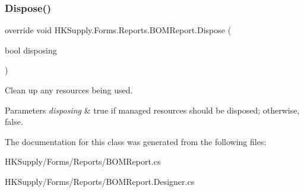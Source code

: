 \subsubsection{\texorpdfstring{Dispose()}{Dispose()}}
{\footnotesize\ttfamily override void H\+K\+Supply.\+Forms.\+Reports.\+B\+O\+M\+Report.\+Dispose (\begin{DoxyParamCaption}\item[{bool}]{disposing }\end{DoxyParamCaption})\hspace{0.3cm}{\ttfamily [protected]}}



Clean up any resources being used. 


\begin{DoxyParams}{Parameters}
{\em disposing} & true if managed resources should be disposed; otherwise, false.\\
\hline
\end{DoxyParams}


The documentation for this class was generated from the following files\+:\begin{DoxyCompactItemize}
\item 
H\+K\+Supply/\+Forms/\+Reports/B\+O\+M\+Report.\+cs\item 
H\+K\+Supply/\+Forms/\+Reports/B\+O\+M\+Report.\+Designer.\+cs\end{DoxyCompactItemize}
